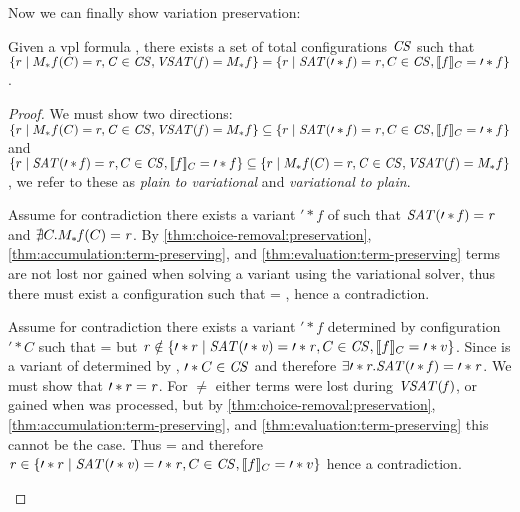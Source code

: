 Now we can finally show variation preservation:
\begin{theorem}
  \label{thm:variation-preservation}
  Given a \ac{vpl} formula \fV{}, there exists a set of total configurations
  $\mathit{CS}$ such that $\setc{r}{\submodel{f}{C} = r, \kf{C} \in \kf{CS},
    \kf{VSAT(f)} = \vmodel*{f}} = \setc{r}{\kf{SAT(\prime*{f}) = r}, C \in
    \kf{CS}, \sem[C]{f} = \prime*{f}}$.
\end{theorem}
%
\begin{proof}
  We must show two directions: $\setc{r}{\submodel{f}{C} = r, \kf{C} \in
    \kf{CS}, \kf{VSAT(f)} = \vmodel*{f}} \subseteq \setc{r}{\kf{SAT(\prime*{f})
      = r}, C \in \kf{CS}, \sem[C]{f} = \prime*{f}}$ and
  $\setc{r}{\kf{SAT(\prime*{f}) = r}, C \in \kf{CS}, \sem[C]{f} = \prime*{f}}
  \subseteq \setc{r}{\submodel{f}{C} = r, \kf{C} \in \kf{CS}, \kf{VSAT(f)} =
    \vmodel*{f}}$, we refer to these as \emph{plain to variational} and
  \emph{variational to plain}.
  \begin{subproof}
    Assume for contradiction there exists a variant $\prime*{f}$ of \fV{} such
    that $\mathit{SAT(\prime*{f})} = \mathit{r}{}$ and $\nexists C. M_{*}{\mathit{f}}(C) =
    \mathit{r}$. By \autoref{thm:choice-removal:preservation},
    \autoref{thm:accumulation:term-preserving}, and
    \autoref{thm:evaluation:term-preserving} terms are not lost nor gained when
    solving a variant using the variational solver, thus there must exist a
    configuration  such that  = \rV{}, hence a
    contradiction.
  \end{subproof}
  \begin{subproof}
    Assume for contradiction there exists a variant $\prime*{f}$ determined by
    configuration $\prime*{C}$ such that  = \rV{} but
    $\rV{} \notin \setc{\prime*{r}}{\kf{SAT(\prime*{v}) = \prime*{r}}, C \in
      \kf{CS}, \sem[C]{f} = \prime*{v}}$. Since  is a variant of \fV{}
    determined by , $\prime*{C} \in \mathit{CS}$ and therefore $\exists
    \prime*{r}. \mathit{SAT(\prime*{f}) = \prime*{r}}$. We must show that
    $\prime*{r} = \mathit{r}$. For  $\neq$ \rV{} either terms were lost
    during $\mathit{VSAT(f)}$, or gained when  was processed, but by
    \autoref{thm:choice-removal:preservation},
    \autoref{thm:accumulation:term-preserving}, and
    \autoref{thm:evaluation:term-preserving} this cannot be the case. Thus
     = \rV{} and therefore $\rV{} \in
    \setc{\prime*{r}}{\kf{SAT(\prime*{v}) = \prime*{r}}, C \in \kf{CS},
      \sem[C]{f} = \prime*{v}}$ hence a contradiction.
  \end{subproof}


\end{proof}

